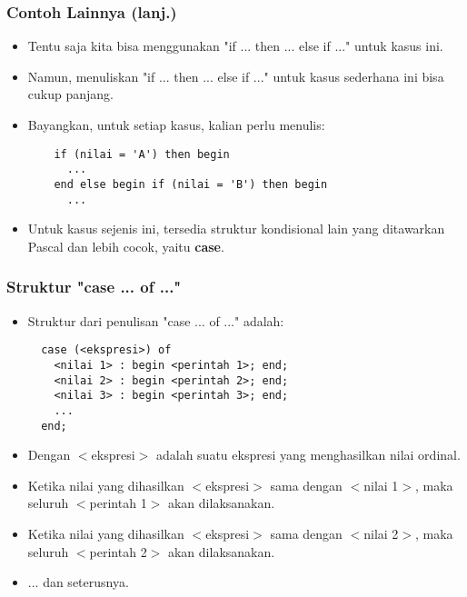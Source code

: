 \begin{frame}[fragile]
\frametitle{Contoh Lainnya (lanj.)}
\begin{itemize}
  \item Tentu saja kita bisa menggunakan "if ... then ... else if ..." untuk kasus ini.
  \item Namun, menuliskan "if ... then ... else if ..." untuk kasus sederhana ini bisa cukup panjang.
  \item Bayangkan, untuk setiap kasus, kalian perlu menulis:
  \begin{lstlisting}
    if (nilai = 'A') then begin
      ...
    end else begin if (nilai = 'B') then begin
      ...
  \end{lstlisting}
  \item Untuk kasus sejenis ini, tersedia struktur kondisional lain yang ditawarkan Pascal dan lebih cocok, yaitu \alert{\textbf{case}}.
\end{itemize}
\end{frame}

\begin{frame}[fragile]
\frametitle{Struktur "case ... of ..."}
\begin{itemize}
  \item Struktur dari penulisan "case ... of ..." adalah:
  \begin{lstlisting}
  case (<ekspresi>) of
    <nilai 1> : begin <perintah 1>; end;
    <nilai 2> : begin <perintah 2>; end;
    <nilai 3> : begin <perintah 3>; end;
    ...
  end;
  \end{lstlisting}

  \item Dengan $<$ekspresi$>$ adalah suatu ekspresi yang menghasilkan \alert{nilai ordinal}.
  \item Ketika nilai yang dihasilkan $<$ekspresi$>$ sama dengan $<$nilai 1$>$, maka seluruh $<$perintah 1$>$ akan dilaksanakan.
  \item Ketika nilai yang dihasilkan $<$ekspresi$>$ sama dengan $<$nilai 2$>$, maka seluruh $<$perintah 2$>$ akan dilaksanakan.
  \item ... dan seterusnya.
\end{itemize}
\end{frame}

